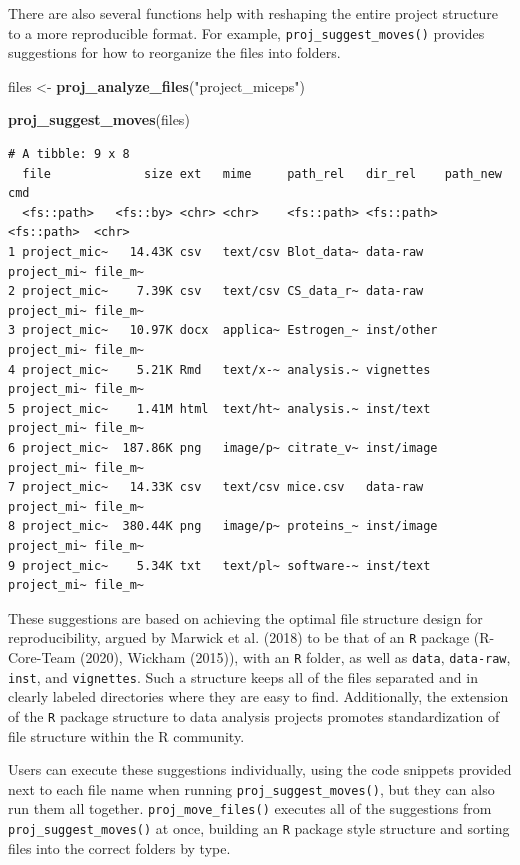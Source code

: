 \documentclass[12pt,twoside]{reedthesis}
\newenvironment{Shaded}{\begin{snugshade}}{\end{snugshade}}
\newcommand{\KeywordTok}[1]{\textcolor[rgb]{0.13,0.29,0.53}{\textbf{#1}}}
\newcommand{\NormalTok}[1]{#1}
\newcommand{\StringTok}[1]{\textcolor[rgb]{0.31,0.60,0.02}{#1}}
\begin{document}
There are also several functions help with reshaping the entire project structure to a more reproducible format. For example, \texttt{proj\_suggest\_moves()} provides suggestions for how to reorganize the files into folders.
\begin{Shaded}
\begin{Highlighting}[]
\NormalTok{files <-}\StringTok{ }\KeywordTok{proj_analyze_files}\NormalTok{(}\StringTok{"project_miceps"}\NormalTok{)}

\KeywordTok{proj_suggest_moves}\NormalTok{(files)}
\end{Highlighting}
\end{Shaded}
\footnotesize
\begin{verbatim}
# A tibble: 9 x 8
  file             size ext   mime     path_rel   dir_rel    path_new    cmd    
  <fs::path>   <fs::by> <chr> <chr>    <fs::path> <fs::path> <fs::path>  <chr>  
1 project_mic~   14.43K csv   text/csv Blot_data~ data-raw   project_mi~ file_m~
2 project_mic~    7.39K csv   text/csv CS_data_r~ data-raw   project_mi~ file_m~
3 project_mic~   10.97K docx  applica~ Estrogen_~ inst/other project_mi~ file_m~
4 project_mic~    5.21K Rmd   text/x-~ analysis.~ vignettes  project_mi~ file_m~
5 project_mic~    1.41M html  text/ht~ analysis.~ inst/text  project_mi~ file_m~
6 project_mic~  187.86K png   image/p~ citrate_v~ inst/image project_mi~ file_m~
7 project_mic~   14.33K csv   text/csv mice.csv   data-raw   project_mi~ file_m~
8 project_mic~  380.44K png   image/p~ proteins_~ inst/image project_mi~ file_m~
9 project_mic~    5.34K txt   text/pl~ software-~ inst/text  project_mi~ file_m~
\end{verbatim}
\normalsize

These suggestions are based on achieving the optimal file structure design for reproducibility, argued by Marwick et al. (2018) to be that of an \texttt{R} package (R-Core-Team (2020), Wickham (2015)), with an \texttt{R} folder, as well as \texttt{data}, \texttt{data-raw}, \texttt{inst}, and \texttt{vignettes}. Such a structure keeps all of the files separated and in clearly labeled directories where they are easy to find. Additionally, the extension of the \texttt{R} package structure to data analysis projects promotes standardization of file structure within the R community.

Users can execute these suggestions individually, using the code snippets provided next to each file name when running \texttt{proj\_suggest\_moves()}, but they can also run them all together. \texttt{proj\_move\_files()} executes all of the suggestions from \texttt{proj\_suggest\_moves()} at once, building an \texttt{R} package style structure and sorting files into the correct folders by type.
\end{document}

